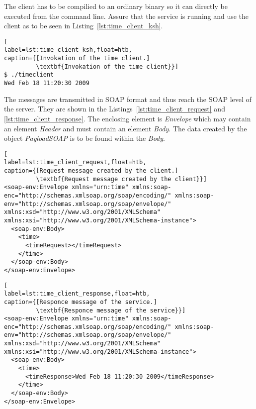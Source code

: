 The client has to be compilied to an ordinary binary so it can directly be executed from the command line.
Assure that the service is running and use the client as to be seen in Listing~\ref{lst:time_client_ksh}.
\begin{lstlisting}[
label=lst:time_client_ksh,float=htb,
caption={[Invokation of the time client.]
         \textbf{Invokation of the time client}}]
$ ./timeclient
Wed Feb 18 11:20:30 2009
\end{lstlisting}
The messages are transmitted in SOAP format and thus reach the SOAP level of the server. They are shown in the Listings~\ref{lst:time_client_request} and \ref{lst:time_client_response}.
The enclosing element is \textit{Envelope} which may contain an element \textit{Header} and must contain an element \textit{Body}. %
The data created by the object \textit{PayloadSOAP} is to be found within the \textit{Body}.
\begin{lstlisting}[
label=lst:time_client_request,float=htb,
caption={[Request message created by the client.]
         \textbf{Request message created by the client}}]
<soap-env:Envelope xmlns="urn:time" xmlns:soap-enc="http://schemas.xmlsoap.org/soap/encoding/" xmlns:soap-env="http://schemas.xmlsoap.org/soap/envelope/" xmlns:xsd="http://www.w3.org/2001/XMLSchema" xmlns:xsi="http://www.w3.org/2001/XMLSchema-instance">
  <soap-env:Body>
    <time>
      <timeRequest></timeRequest>
    </time>
  </soap-env:Body>
</soap-env:Envelope>
\end{lstlisting}


\begin{lstlisting}[
label=lst:time_client_response,float=htb,
caption={[Responce message of the service.]
         \textbf{Responce message of the service}}]
<soap-env:Envelope xmlns="urn:time" xmlns:soap-enc="http://schemas.xmlsoap.org/soap/encoding/" xmlns:soap-env="http://schemas.xmlsoap.org/soap/envelope/" xmlns:xsd="http://www.w3.org/2001/XMLSchema" xmlns:xsi="http://www.w3.org/2001/XMLSchema-instance">
  <soap-env:Body>
    <time>
      <timeResponse>Wed Feb 18 11:20:30 2009</timeResponse>
    </time>
  </soap-env:Body>
</soap-env:Envelope>
\end{lstlisting}


















